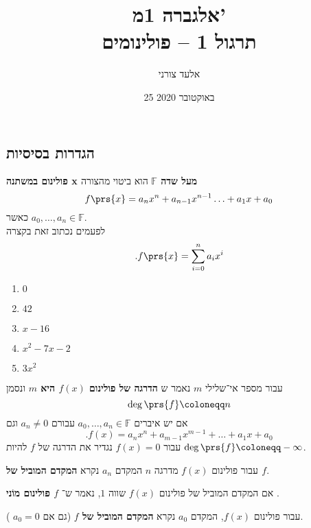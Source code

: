 \documentclass[article, 10pt,oneside]{article}
\title{
אלגברה 1מ' \\ תרגול 1 -- פולינומים
}
\author{אלעד צורני}
\date{
25 באוקטובר 2020
}
\renewcommand{\emph}[1]{\textbf{#1}}
\begin{document}
\maketitle

\subsection*{הגדרות בסיסיות}

\begin{definition}[פולינום]
\emph{פולינום במשתנה x מעל שדה $\mathbb{F}$}
הוא ביטוי מהצורה
\[
f\prs{x} = a_n x^n + a_{n-1} x^{n-1} \ldots + a_1 x + a_0
\]
כאשר
$a_0, \ldots, a_n \in \mathbb{F}$.\\
לפעמים נכתוב זאת בקצרה
\[\text{.} f\prs{x} = \sum_{i = 0}^n a_i x^i\]
\end{definition}

\begin{examples*}[פולינומים]
\enumthm
\begin{enumerate}
\item $0$
\item $42$
\item $x-16$
\item $x^2 - 7x - 2$
\item $3 x^2$ 
\end{enumerate}
\end{examples*}

\begin{definition}
עבור מספר אי־שלילי
$m$
נאמר ש%
\emph{הדרגה של פולינום
$f(x)$
היא
$m$}
ונסמן
\[\deg \prs{f} \coloneqq n\]
אם יש איברים
$a_0, \ldots, a_n \in \mathbb{F}$
עבורם
$a_n \neq 0$
וגם
\[\text{.} f(x) = a_n x^n + a_{m-1} x^{m-1} + \ldots + a_1 x + a_0\]
עבור
$f(x) = 0$
נגדיר את הדרגה של
$f$
להיות
$\deg\prs{f} \coloneqq -\infty$.
\end{definition}

\begin{definition}
עבור פולינום
$f(x)$
מדרגה
$n$
המקדם
$a_n$
נקרא
\emph{המקדם המוביל של
$f$}.
\end{definition}

\begin{definition}[פולינום מוֹני]
אם המקדם המוביל של פולינום
$f(x)$
שווה
$1$,
נאמר ש־%
\emph{$f$
פולינום מוֹני%
}.
\end{definition}

\begin{definition}
עבור פולינום
$f(x)$,
המקדם
$a_0$
נקרא
\emph{המקדם המוביל של
$f$}
(גם אם
$a_0 = 0$%
).
\end{definition}
\end{document}
